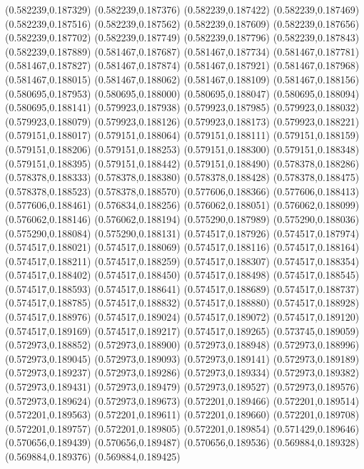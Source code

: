 (0.582239,0.187329)
(0.582239,0.187376)
(0.582239,0.187422)
(0.582239,0.187469)
(0.582239,0.187516)
(0.582239,0.187562)
(0.582239,0.187609)
(0.582239,0.187656)
(0.582239,0.187702)
(0.582239,0.187749)
(0.582239,0.187796)
(0.582239,0.187843)
(0.582239,0.187889)
(0.581467,0.187687)
(0.581467,0.187734)
(0.581467,0.187781)
(0.581467,0.187827)
(0.581467,0.187874)
(0.581467,0.187921)
(0.581467,0.187968)
(0.581467,0.188015)
(0.581467,0.188062)
(0.581467,0.188109)
(0.581467,0.188156)
(0.580695,0.187953)
(0.580695,0.188000)
(0.580695,0.188047)
(0.580695,0.188094)
(0.580695,0.188141)
(0.579923,0.187938)
(0.579923,0.187985)
(0.579923,0.188032)
(0.579923,0.188079)
(0.579923,0.188126)
(0.579923,0.188173)
(0.579923,0.188221)
(0.579151,0.188017)
(0.579151,0.188064)
(0.579151,0.188111)
(0.579151,0.188159)
(0.579151,0.188206)
(0.579151,0.188253)
(0.579151,0.188300)
(0.579151,0.188348)
(0.579151,0.188395)
(0.579151,0.188442)
(0.579151,0.188490)
(0.578378,0.188286)
(0.578378,0.188333)
(0.578378,0.188380)
(0.578378,0.188428)
(0.578378,0.188475)
(0.578378,0.188523)
(0.578378,0.188570)
(0.577606,0.188366)
(0.577606,0.188413)
(0.577606,0.188461)
(0.576834,0.188256)
(0.576062,0.188051)
(0.576062,0.188099)
(0.576062,0.188146)
(0.576062,0.188194)
(0.575290,0.187989)
(0.575290,0.188036)
(0.575290,0.188084)
(0.575290,0.188131)
(0.574517,0.187926)
(0.574517,0.187974)
(0.574517,0.188021)
(0.574517,0.188069)
(0.574517,0.188116)
(0.574517,0.188164)
(0.574517,0.188211)
(0.574517,0.188259)
(0.574517,0.188307)
(0.574517,0.188354)
(0.574517,0.188402)
(0.574517,0.188450)
(0.574517,0.188498)
(0.574517,0.188545)
(0.574517,0.188593)
(0.574517,0.188641)
(0.574517,0.188689)
(0.574517,0.188737)
(0.574517,0.188785)
(0.574517,0.188832)
(0.574517,0.188880)
(0.574517,0.188928)
(0.574517,0.188976)
(0.574517,0.189024)
(0.574517,0.189072)
(0.574517,0.189120)
(0.574517,0.189169)
(0.574517,0.189217)
(0.574517,0.189265)
(0.573745,0.189059)
(0.572973,0.188852)
(0.572973,0.188900)
(0.572973,0.188948)
(0.572973,0.188996)
(0.572973,0.189045)
(0.572973,0.189093)
(0.572973,0.189141)
(0.572973,0.189189)
(0.572973,0.189237)
(0.572973,0.189286)
(0.572973,0.189334)
(0.572973,0.189382)
(0.572973,0.189431)
(0.572973,0.189479)
(0.572973,0.189527)
(0.572973,0.189576)
(0.572973,0.189624)
(0.572973,0.189673)
(0.572201,0.189466)
(0.572201,0.189514)
(0.572201,0.189563)
(0.572201,0.189611)
(0.572201,0.189660)
(0.572201,0.189708)
(0.572201,0.189757)
(0.572201,0.189805)
(0.572201,0.189854)
(0.571429,0.189646)
(0.570656,0.189439)
(0.570656,0.189487)
(0.570656,0.189536)
(0.569884,0.189328)
(0.569884,0.189376)
(0.569884,0.189425)

